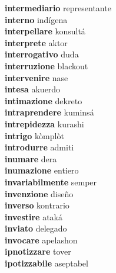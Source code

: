 \textbf{intermediario } representante \\
\textbf{interno } indígena \\
\textbf{interpellare } konsultá \\
\textbf{interprete } aktor \\
\textbf{interrogativo } duda \\
\textbf{interruzione } blackout \\
\textbf{intervenire } nase \\
\textbf{intesa } akuerdo \\
\textbf{intimazione } dekreto \\
\textbf{intraprendere } kuminsá \\
\textbf{intrepidezza } kurashi \\
\textbf{intrigo } kòmplòt \\
\textbf{introdurre } admiti \\
\textbf{inumare } dera \\
\textbf{inumazione } entiero \\
\textbf{invariabilmente } semper \\
\textbf{invenzione } diseño \\
\textbf{inverso } kontrario \\
\textbf{investire } ataká \\
\textbf{inviato } delegado \\
\textbf{invocare } apelashon \\
\textbf{ipnotizzare } tover \\
\textbf{ipotizzabile } aseptabel \\

